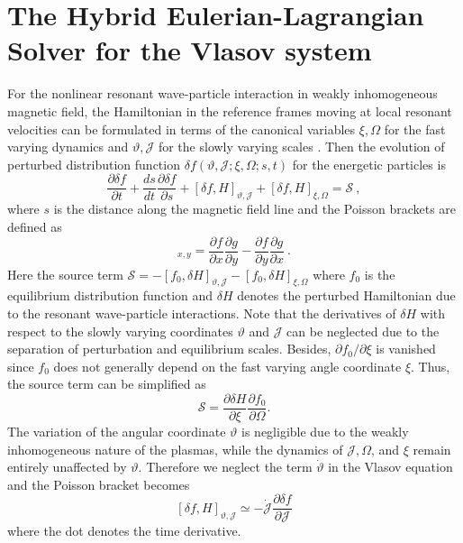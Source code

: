 \section{The Hybrid Eulerian-Lagrangian Solver for the Vlasov system}
\label{sec:vlasov}
For the nonlinear resonant wave-particle interaction in weakly inhomogeneous magnetic field,
the  Hamiltonian 
 in the reference frames moving at local resonant velocities 
can be formulated in terms of   
the canonical variables $\xi,\Omega$ for the fast   varying
dynamics 
and $\vartheta,\mathcal{J}$ 
for the slowly varying scales
 \cite{zheng2023a}.
 Then the evolution of  perturbed distribution function $\delta f(\vartheta,\mathcal{J};\xi,\Omega;s,t)$ for the energetic particles is
\begin{equation}\label{eq.deltaf}
    \frac{\partial \delta f}{\partial t}+ \frac{d s}{d t} \frac{\partial \delta f}{\partial s} + \left[\delta f, H\right]_{\vartheta,\mathcal{J}} +  \left[\delta f, H\right]_{\xi,\Omega} = \mathcal{S}~,
\end{equation}
where $s$ is the distance along the magnetic field line and  the   Poisson brackets are defined as
\begin{equation}
    [f,~g]_{x,y} = \frac{\partial f}{\partial x}\frac{\partial g}{\partial y}-\frac{\partial f}{\partial y}\frac{\partial g}{\partial x}~.
\end{equation}
Here 
the source term $\mathcal{S}= -\left[f_0, \delta H\right]_{\vartheta, \mathcal{J}} - \left[f_0, \delta H\right]_{\xi, \Omega}$ 
where $f_0$ is the equilibrium distribution function and $\delta H$ denotes the perturbed Hamiltonian due to the resonant wave-particle interactions.
Note that the derivatives of $\delta H$ with respect to the slowly varying coordinates $\vartheta$ and $\mathcal{J}$ can be neglected due to the separation of perturbation and equilibrium scales. Besides, $\partial f_0/\partial \xi$ is vanished since $f_0$ does not generally depend on the fast varying angle coordinate $\xi$.
Thus, the source term can be simplified as 
\begin{equation}
     \mathcal{S} = \frac{\partial \delta H}{\partial \xi}\frac{\partial f_0}{\partial \Omega}.
\end{equation}
The variation of the angular coordinate $\vartheta$ is negligible due to the weakly inhomogeneous nature of the plasmas, while the dynamics of $\mathcal{J}, \Omega$, and $\xi$ remain entirely unaffected by $\vartheta$.
Therefore we neglect the term $ \dot{\vartheta} $ in the Vlasov equation and the  Poisson bracket becomes
\begin{equation}
\left[\delta f, H\right]_{\vartheta,\mathcal{J}}\simeq 
 -\dot{\mathcal{J}} \frac{\partial \delta f}{\partial \mathcal{J}}      
\end{equation}
where the dot denotes the time derivative.


